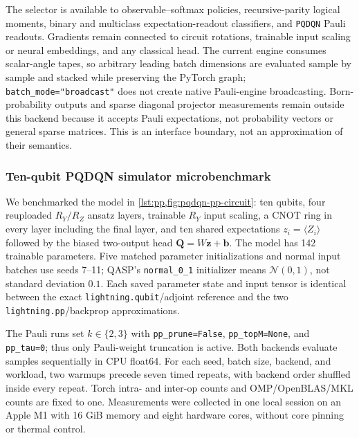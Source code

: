 \documentclass[10pt]{article}
\newcommand{\code}[1]{\texttt{#1}}
\begin{document}
The selector is available to observable--softmax policies, recursive-parity
logical moments, binary and multiclass expectation-readout classifiers, and
\code{PQDQN} Pauli readouts.  Gradients remain connected to circuit rotations,
trainable input scaling or neural embeddings, and any classical head.  The
current engine consumes scalar-angle tapes, so arbitrary leading batch
dimensions are evaluated sample by sample and stacked while preserving the
PyTorch graph; \code{batch\_mode="broadcast"} does not create native Pauli-engine
broadcasting.  Born-probability outputs and sparse diagonal projector
measurements remain outside this backend because it accepts Pauli expectations,
not probability vectors or general sparse matrices.  This is an interface
boundary, not an approximation of their semantics.

\subsubsection{Ten-qubit PQDQN simulator microbenchmark}
\label{sec:pqdqn-pp-benchmark}

We benchmarked the model in \cref{lst:pp,fig:pqdqn-pp-circuit}: ten qubits,
four reuploaded $R_Y/R_Z$ ansatz layers, trainable $R_Y$ input scaling, a CNOT
ring in every layer including the final layer, and ten shared expectations
$z_i=\langle Z_i\rangle$ followed by the biased two-output head
$\bm Q=W\bm z+\bm b$.  The model has 142 trainable parameters.  Five matched
parameter initializations and normal input batches use seeds 7--11; QASP's
\code{normal\_0\_1} initializer means $\mathcal N(0,1)$, not standard deviation
$0.1$.  Each saved parameter state and input tensor is identical between the
exact \code{lightning.qubit}/adjoint reference and the two
\code{lightning.pp}/backprop approximations.

The Pauli runs set $k\in\{2,3\}$ with \code{pp\_prune=False},
\code{pp\_topM=None}, and \code{pp\_tau=0}; thus only Pauli-weight truncation is
active.  Both backends evaluate samples sequentially in CPU float64.  For each
seed, batch size, backend, and workload, two warmups precede seven timed
repeats, with backend order shuffled inside every repeat.  Torch intra- and
inter-op counts and OMP/OpenBLAS/MKL counts are fixed to one.  Measurements
were collected in one local session on an Apple M1 with 16 GiB memory and eight
hardware cores, without core pinning or thermal control.
\end{document}
